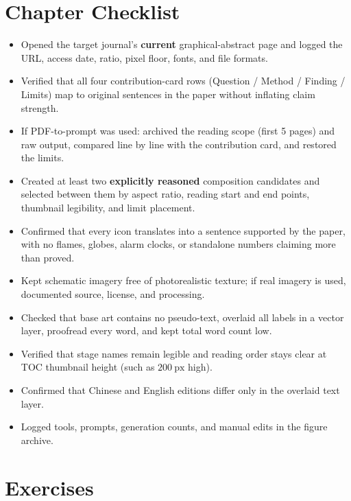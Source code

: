 \section{Chapter Checklist}

\begin{itemize}
\item Opened the target journal's \textbf{current} graphical-abstract page and logged the URL, access date, ratio, pixel floor, fonts, and file formats.
\item Verified that all four contribution-card rows (Question / Method / Finding / Limits) map to original sentences in the paper without inflating claim strength.
\item If PDF-to-prompt was used: archived the reading scope (first 5 pages) and raw output, compared line by line with the contribution card, and restored the limits.
\item Created at least two \textbf{explicitly reasoned} composition candidates and selected between them by aspect ratio, reading start and end points, thumbnail legibility, and limit placement.
\item Confirmed that every icon translates into a sentence supported by the paper, with no flames, globes, alarm clocks, or standalone numbers claiming more than proved.
\item Kept schematic imagery free of photorealistic texture; if real imagery is used, documented source, license, and processing.
\item Checked that base art contains no pseudo-text, overlaid all labels in a vector layer, proofread every word, and kept total word count low.
\item Verified that stage names remain legible and reading order stays clear at TOC thumbnail height (such as $200\ \text{px}$ high).
\item Confirmed that Chinese and English editions differ only in the overlaid text layer.
\item Logged tools, prompts, generation counts, and manual edits in the figure archive.
\end{itemize}

\section{Exercises}

